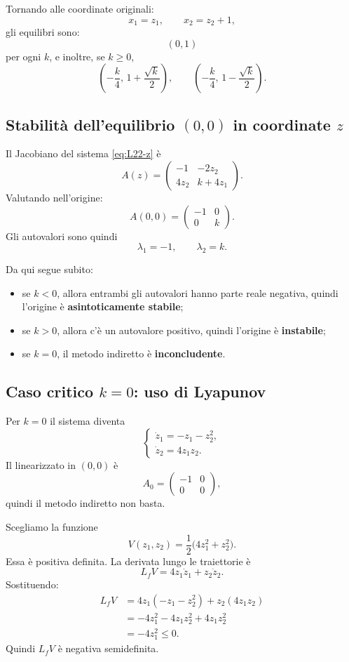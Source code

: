 Tornando alle coordinate originali:
\[
x_1=z_1,
\qquad
x_2=z_2+1,
\]
gli equilibri sono:
\[
(0,1)
\]
per ogni \(k\), e inoltre, se \(k\ge 0\),
\[
\left(-\frac{k}{4},\,1+\frac{\sqrt{k}}{2}\right),
\qquad
\left(-\frac{k}{4},\,1-\frac{\sqrt{k}}{2}\right).
\]

\subsection{Stabilità dell'equilibrio \((0,0)\) in coordinate \(z\)}

Il Jacobiano del sistema \eqref{eq:L22-z} è
\[
A(z)=
\begin{pmatrix}
-1 & -2z_2\\
4z_2 & k+4z_1
\end{pmatrix}.
\]
Valutando nell'origine:
\[
A(0,0)=
\begin{pmatrix}
-1 & 0\\
0 & k
\end{pmatrix}.
\]
Gli autovalori sono quindi
\[
\lambda_1=-1,
\qquad
\lambda_2=k.
\]

Da qui segue subito:
\begin{itemize}
    \item se \(k<0\), allora entrambi gli autovalori hanno parte reale negativa, quindi l'origine è \textbf{asintoticamente stabile};
    \item se \(k>0\), allora c'è un autovalore positivo, quindi l'origine è \textbf{instabile};
    \item se \(k=0\), il metodo indiretto è \textbf{inconcludente}.
\end{itemize}

\subsection{Caso critico \(k=0\): uso di Lyapunov}

Per \(k=0\) il sistema diventa
\[
\begin{cases}
\dot z_1 = -z_1-z_2^2,\\[4pt]
\dot z_2 = 4z_1z_2.
\end{cases}
\]
Il linearizzato in \((0,0)\) è
\[
A_0=
\begin{pmatrix}
-1 & 0\\
0 & 0
\end{pmatrix},
\]
quindi il metodo indiretto non basta.

Scegliamo la funzione
\[
V(z_1,z_2)=\frac{1}{2}\bigl(4z_1^2+z_2^2\bigr).
\]
Essa è positiva definita. La derivata lungo le traiettorie è
\[
L_fV = 4z_1\dot z_1 + z_2\dot z_2.
\]
Sostituendo:
\begin{align*}
L_fV
&=
4z_1(-z_1-z_2^2)+z_2(4z_1z_2)\\
&=
-4z_1^2-4z_1z_2^2+4z_1z_2^2\\
&=
-4z_1^2\le 0.
\end{align*}
Quindi \(L_fV\) è negativa semidefinita.

